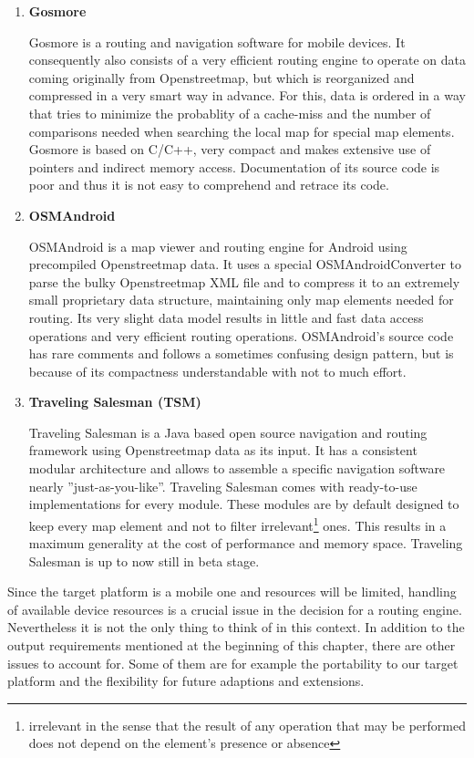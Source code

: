 \begin{enumerate}

	\item \textbf{Gosmore}
	
		Gosmore is a routing and navigation software for mobile devices. It consequently also consists of a very efficient routing engine to operate on data coming originally from Openstreetmap, but which is reorganized and compressed in a very smart way in advance. For this, data is ordered in a way that tries to minimize the probablity of a cache-miss and the number of comparisons needed when searching the local map for special map elements.
		Gosmore is based on C/C++, very compact and makes extensive use of pointers and indirect memory access. Documentation of its source code is poor and thus it is not easy to comprehend and retrace its code.
	
	\item \textbf{OSMAndroid}
	
		OSMAndroid is a map viewer and routing engine for Android using precompiled Openstreetmap data. It uses a special OSMAndroidConverter to parse the bulky Openstreetmap XML file and to compress it to an extremely small 	proprietary data structure, maintaining only map elements needed for routing. Its very slight data model results in little and fast data access operations and very efficient routing operations.
		OSMAndroid's source code has rare comments and follows a sometimes confusing design pattern, but is because of its compactness understandable with not to much effort.
	
	\item \textbf{Traveling Salesman (TSM)}
	
		Traveling Salesman is a Java based open source navigation and routing framework using Openstreetmap data as its input. It has a consistent modular architecture and allows to assemble a specific navigation software nearly ''just-as-you-like''. Traveling Salesman comes with ready-to-use implementations for every module. These modules are by default designed to keep every map element and not to filter irrelevant\footnote{irrelevant in the sense that the result of any operation that may be performed does not depend on the element's presence or absence} ones. This results in a maximum generality at the cost of performance and memory space.
		Traveling Salesman is up to now still in beta stage.

\end{enumerate}

Since the target platform is a mobile one and resources will be limited, handling of available device resources is a crucial issue in the decision for a routing engine. Nevertheless it is not the only thing to think of in this context. In addition to the output requirements mentioned at the beginning of this chapter, there are other issues to account for. Some of them are for example the portability to our target platform and the flexibility for future adaptions and extensions.\newline

